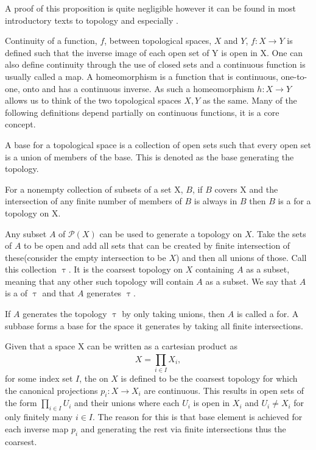 \documentclass[../../main.tex]{subfiles}
\begin{document}
    A proof of this proposition is quite negligible however it can be found in most introductory texts to topology and especially \cite{armstrong-basictop}.
    
    Continuity of a function, $f$, between topological spaces, $X$ and $Y$, $f:X\to Y$ is defined such that the inverse image of each open set of Y is open in X. One can also define continuity through the use of closed sets and a continuous function is usually called a map. A homeomorphism is a function that is continuous, one-to-one, onto and has a continuous inverse. As such a homeomorphism $h:X\to Y$ allows us to think of the two topological spaces $X, Y$ as the same. Many of the following definitions depend partially on continuous functions, it is a core concept.
    
    A base for a topological space is a collection of open sets such that every open set is a union of members of the base. This is denoted as the base generating the topology.
    
    \begin{definition}
        For a nonempty collection of subsets of a set X, $B$, if $B$ covers X and the intersection of any finite number of members of $B$ is always in $B$ then $B$ is a  for a topology on X.
    \end{definition}
    
    Any subset $A$ of $\mathcal{P}(X)$ can be used to generate a topology on $X$. Take the sets of $A$ to be open and add all sets that can be created by finite intersection of these(consider the empty intersection to be $X$) and then all unions of those. Call this collection $\uptau$. It is the coarsest topology on $X$ containing $A$ as a subset, meaning that any other such topology will contain $A$ as a subset. We say that $A$ is a  of $\uptau$ and that $A$ generates $\uptau$. 
    
    If $A$ generates the topology $\uptau$ by only taking unions, then $A$ is called a  for. A subbase forms a base for the space it generates by taking all finite intersections.
    
    \begin{definition}
        Given that a space X can be written as a cartesian product as $$X=\prod_{i\in I}^{}X_i,$$ for some index set $I$, the  on $X$ is defined to be the coarsest topology for which the canonical projections $p_i:X\to X_i$ are continuous. This results in open sets of the form $ \prod_{i\in I}U_i$ and their unions where each $U_i$ is open in $X_i$ and $U_i \ne X_i$ for only finitely many $i\in I$. The reason for this is that  base element is achieved for each inverse map $p_i$ and generating the rest via finite intersections thus the coarsest.
    \end{definition}
    
\end{document}
